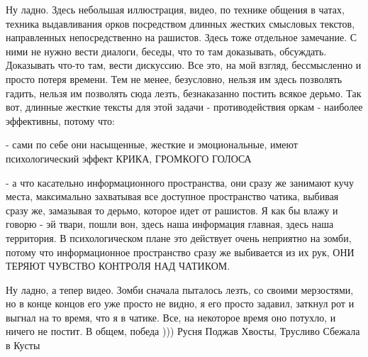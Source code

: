 Ну ладно. Здесь небольшая иллюстрация, видео, по технике общения в чатах,
техника выдавливания орков посредством длинных жестких смысловых текстов,
направленных непосредственно на рашистов. Здесь тоже отдельное замечание. С
ними не нужно вести диалоги, беседы, что то там доказывать, обсуждать.
Доказывать что-то там, вести дискуссию. Все это, на мой взгляд, бессмысленно и
просто потеря времени. Тем не менее, безусловно, нельзя им здесь позволять
гадить, нельзя им позволять сюда лезть, безнаказанно постить всякое дерьмо. Так
вот, длинные жесткие тексты для этой задачи - противодействия оркам - наиболее
эффективны, потому что:

- сами по себе они насыщенные, жесткие и эмоциональные, имеют психологический эффект КРИКА, ГРОМКОГО ГОЛОСА

- а что касательно информационного пространства, они сразу же занимают кучу
места, максимально захватывая все доступное пространство чатика, выбивая сразу
же, замазывая то дерьмо, которое идет от рашистов. Я как бы влажу и говорю - эй
твари, пошли вон, здесь наша информация главная, здесь наша территория. В
психологическом плане это действует очень неприятно на зомби, потому что
информационное пространство сразу же выбивается из их рук, ОНИ ТЕРЯЮТ ЧУВСТВО
КОНТРОЛЯ НАД ЧАТИКОМ.

Ну ладно, а тепер видео. Зомби сначала пыталось лезть, со своими мерзостями, но
в конце концов его уже просто не видно, я его просто задавил, заткнул рот и
выгнал на то время, что я в чатике. Все, на некоторое время оно потухло, и
ничего не постит. В общем, победа ))) Русня Поджав Хвосты, Трусливо Сбежала в
Кусты 💛 💙 💛 💙 💛 💙      
